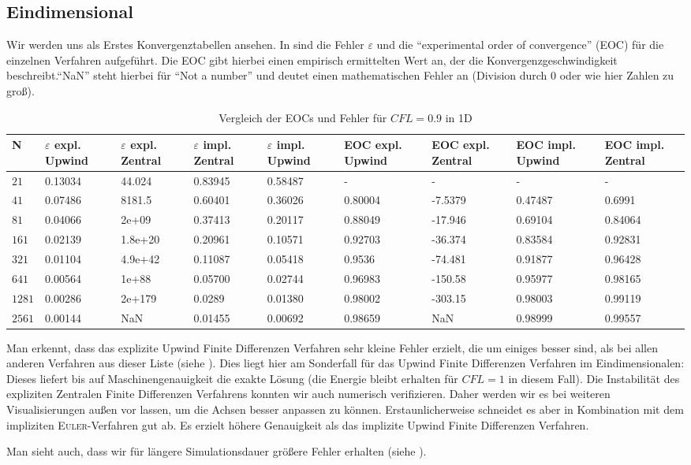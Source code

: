 \documentclass[12pt,a4paper]{scrartcl}
\numberwithin{equation}{section} %
\theoremstyle{definition}
\theoremstyle{plain}
\begin{document}
\subsection{Eindimensional}
Wir werden uns als Erstes Konvergenztabellen ansehen.
In  sind die Fehler $\varepsilon$ und die "`experimental order of convergence"' (EOC) für die einzelnen Verfahren aufgeführt. Die EOC gibt hierbei einen empirisch ermittelten Wert an, der die Konvergenzgeschwindigkeit beschreibt."`NaN"' steht hierbei für "`Not a number"' und deutet einen mathematischen Fehler an (Division durch $0$ oder wie hier Zahlen zu groß). 
\begin{table}
\caption{Vergleich der EOCs und Fehler für $CFL=0.9$ in 1D}
\label{tab:VergleichLoe}
\begin{tabularx}{\textwidth}{|X|X|X|X|X|X|X|X|X|}
\hline
N & $\varepsilon$ expl. Upwind & $\varepsilon$ expl. Zentral & $\varepsilon$ impl. Zentral & $\varepsilon$ impl. Upwind & EOC expl. Upwind & EOC expl. Zentral & EOC impl. Upwind & EOC impl. Zentral\\\hline
$21$&0.13034&44.024&0.83945&0.58487& -&-&-&-\\
 $41$ &0.07486&8181.5&0.60401&0.36026&0.80004    &-7.5379&0.47487&0.6991 \\
 $81$&0.04066&2e+09& 0.37413&0.20117&0.88049&-17.946&0.69104&0.84064 \\
$161$&0.02139&1.8e+20&0.20961&0.10571& 0.92703&-36.374&0.83584&0.92831 \\
$321$&0.01104&4.9e+42&0.11087& 0.05418& 0.9536&-74.481&0.91877&0.96428 \\ 
$641$&0.00564&1e+88&0.05700&0.02744& 0.96983&-150.58 &0.95977&0.98165  \\
$1281$&0.00286&2e+179&0.0289 &0.01380& 0.98002&-303.15&0.98003&0.99119 \\
$2561$&0.00144&NaN&0.01455&0.00692&0.98659 & NaN &0.98999&0.99557\\\hline
\end{tabularx}
\end{table}
Man erkennt, dass das explizite Upwind Finite Differenzen Verfahren sehr kleine Fehler erzielt, die um einiges besser sind, als bei allen anderen Verfahren aus dieser Liste (siehe ). Dies liegt hier am Sonderfall für das Upwind Finite Differenzen Verfahren im Eindimensionalen: Dieses liefert bis auf Maschinengenauigkeit die exakte Lösung (die Energie bleibt erhalten für $CFL=1$ in diesem Fall). Die Instabilität des expliziten Zentralen Finite Differenzen Verfahrens konnten wir auch numerisch verifizieren. Daher werden wir es bei weiteren Visualisierungen außen vor lassen, um die Achsen besser anpassen zu können.  Erstaunlicherweise schneidet es aber in Kombination mit dem impliziten \textsc{Euler}-Verfahren gut ab. Es erzielt höhere Genauigkeit als das implizite Upwind Finite Differenzen Verfahren. \par Man sieht auch, dass wir für längere Simulationsdauer größere Fehler erhalten (siehe ).
\end{document}
